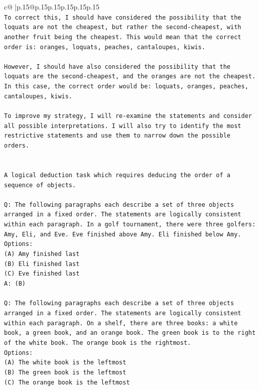 \documentclass{article}
\begin{document}
{\begin{supertabular}{c@{$\;$}|p{.15\linewidth}@{}p{.15\linewidth}p{.15\linewidth}p{.15\linewidth}p{.15\linewidth}p{.15\linewidth}}
{{{\\ 
\texttt{To correct this, I should have considered the possibility that the loquats are not the cheapest, but rather the second{-}cheapest, with another fruit being the cheapest. This would mean that the correct order is: oranges, loquats, peaches, cantaloupes, kiwis.} \\
\\ 
\texttt{However, I should have also considered the possibility that the loquats are the second{-}cheapest, and the oranges are not the cheapest. In this case, the correct order would be: loquats, oranges, peaches, cantaloupes, kiwis.} \\
\\ 
\texttt{To improve my strategy, I will re{-}examine the statements and consider all possible interpretations. I will also try to identify the most restrictive statements and use them to narrow down the possible orders.} \\
\\ 
\\ 
\texttt{A logical deduction task which requires deducing the order of a sequence of objects.} \\
\\ 
\texttt{Q: The following paragraphs each describe a set of three objects arranged in a fixed order. The statements are logically consistent within each paragraph. In a golf tournament, there were three golfers: Amy, Eli, and Eve. Eve finished above Amy. Eli finished below Amy.} \\
\texttt{Options:} \\
\texttt{(A) Amy finished last} \\
\texttt{(B) Eli finished last} \\
\texttt{(C) Eve finished last} \\
\texttt{A: (B)} \\
\\ 
\texttt{Q: The following paragraphs each describe a set of three objects arranged in a fixed order. The statements are logically consistent within each paragraph. On a shelf, there are three books: a white book, a green book, and an orange book. The green book is to the right of the white book. The orange book is the rightmost.} \\
\texttt{Options:} \\
\texttt{(A) The white book is the leftmost} \\
\texttt{(B) The green book is the leftmost} \\
\texttt{(C) The orange book is the leftmost} \\
}}}
\end{supertabular}}
\end{document}

